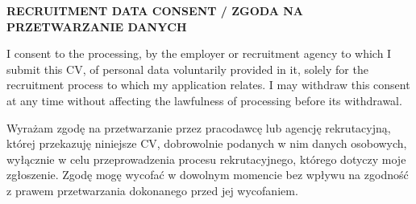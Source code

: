 \vfill
{%
  \fontsize{6.4pt}{7.3pt}\selectfont\bodyfont\color{graytext}\raggedright
  \textbf{RECRUITMENT DATA CONSENT / ZGODA NA PRZETWARZANIE DANYCH}\par
  I consent to the processing, by the employer or recruitment agency to which I submit this CV, of personal data voluntarily provided in it, solely for the recruitment process to which my application relates. I may withdraw this consent at any time without affecting the lawfulness of processing before its withdrawal.\par
  \vspace{0.7mm}
  Wyrażam zgodę na przetwarzanie przez pracodawcę lub agencję rekrutacyjną, której przekazuję niniejsze CV, dobrowolnie podanych w nim danych osobowych, wyłącznie w celu przeprowadzenia procesu rekrutacyjnego, którego dotyczy moje zgłoszenie. Zgodę mogę wycofać w dowolnym momencie bez wpływu na zgodność z prawem przetwarzania dokonanego przed jej wycofaniem.\par
}
\vspace{1mm}
